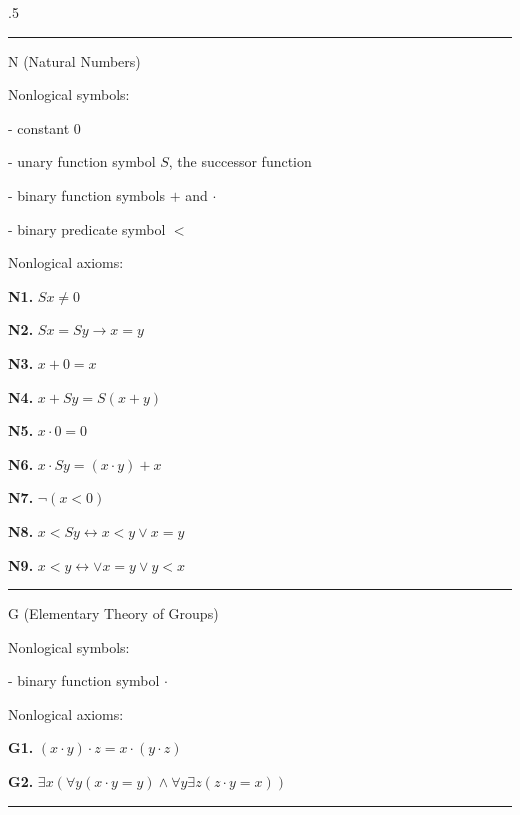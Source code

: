 \vglue .5\baselineskip

\hrule
\beginsection N (Natural Numbers)

Nonlogical symbols:
\item{-} constant $0$
\item{-} unary function symbol $S$, the successor function
\item{-} binary function symbols $+$ and $\cdot$
\item{-} binary predicate symbol $<$
\smallskip

\noindent Nonlogical axioms:
\item{} {\bf N1.} $Sx \ne 0$
\item{} {\bf N2.} $Sx = Sy \to x = y$
\item{} {\bf N3.} $x + 0 = x$
\item{} {\bf N4.} $x + Sy = S(x + y)$
\item{} {\bf N5.} $x \cdot 0 = 0$
\item{} {\bf N6.} $x \cdot Sy = (x \cdot y) + x$
\item{} {\bf N7.} $\neg (x < 0)$
\item{} {\bf N8.} $x < Sy \leftrightarrow x < y \lor x = y$
\item{} {\bf N9.} $x < y \leftrightarrow \lor x = y \lor y < x$
\smallskip
\hrule

\beginsection G (Elementary Theory of Groups)

Nonlogical symbols:
\item{-} binary function symbol $\cdot$
\smallskip

\noindent Nonlogical axioms:
\item{} {\bf G1.} $(x \cdot y) \cdot z = x \cdot (y \cdot z)$
\item{} {\bf G2.} $\exists x(\forall y(x \cdot y = y) \land \forall y \exists z(z \cdot y = x))$
\smallskip
\hrule

\vfill
\break
